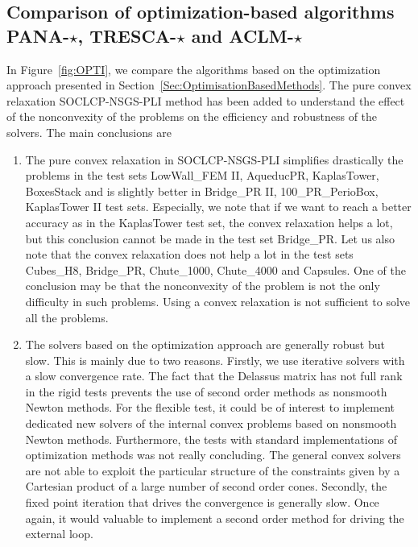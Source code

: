 \subsection{Comparison of optimization-based algorithms {\sf PANA-$\star$, TRESCA-$\star$ and ACLM-$\star$}}

In Figure~\ref{fig:OPTI}, we compare the algorithms based on the optimization approach presented in Section~\ref{Sec:OptimisationBasedMethods}. The pure convex relaxation {\sf SOCLCP-NSGS-PLI}  method has been added to understand the effect of the nonconvexity of the problems on the efficiency and robustness of the solvers. The main conclusions are
\begin{enumerate}
\item The pure convex relaxation in {\sf SOCLCP-NSGS-PLI}  simplifies drastically the problems in the test sets  LowWall\_FEM II, AqueducPR, KaplasTower, BoxesStack  and is slightly better in Bridge\_PR II, 100\_PR\_PerioBox, KaplasTower II test sets. Especially, we note that if we want to reach a better accuracy as in the KaplasTower test set, the convex relaxation helps a lot, but this conclusion cannot be made in the test set Bridge\_PR. Let us also note that  the convex relaxation does not help a lot in the test sets Cubes\_H8, Bridge\_PR, Chute\_1000, Chute\_4000 and Capsules. One of the conclusion may be that the nonconvexity of the problem is not the only difficulty in such problems. Using a convex relaxation is not sufficient to solve all the problems.
\item The solvers based on the optimization approach are generally robust but slow. This is mainly due to two reasons. Firstly,  we use iterative solvers with a slow convergence rate. The fact that  the Delassus matrix has not full rank in the rigid tests prevents the use of second order methods as nonsmooth Newton methods.  For the flexible test, it could be of interest to implement dedicated new solvers of the internal convex problems based on nonsmooth Newton methods. Furthermore, the tests with standard implementations of optimization methods was not really concluding. The general convex solvers are not  able to exploit the particular structure of the constraints given by a Cartesian product of a large number of second order cones. Secondly, the fixed point iteration that drives the convergence is generally slow. Once again, it would valuable to implement a second order method for driving the external loop.

\end{enumerate}
